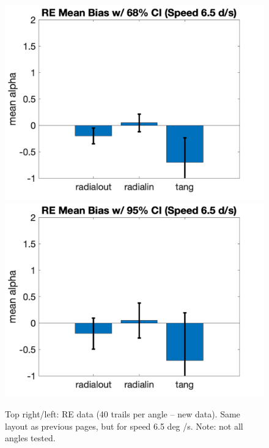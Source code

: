 \documentclass[11pt]{article} %
\begin{document}
\begin{figure}[H]
\includegraphics[scale=.2]{Images/MeanBiasError_68ci_RE_speed6.5.png}
\includegraphics[scale=.2]{Images/MeanBiasError_95ci_RE_speed6.5.png}
\caption{Top right/left: RE data (40 trails per angle -- new data).  Same layout as previous pages, but for speed 6.5 deg /s. Note: not all angles tested.}
\end{figure}

\newpage
\end{document}
